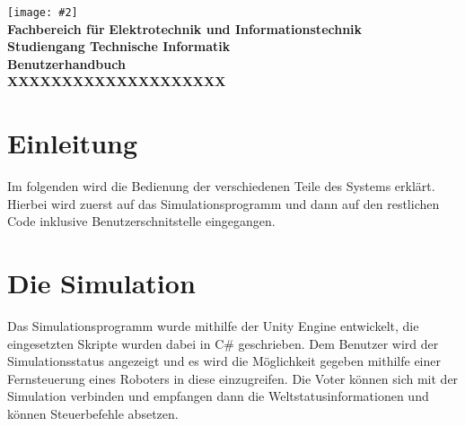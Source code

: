 \documentclass[
    12pt,
    bibliography=totoc,
    ngerman,
    enabledeprecatedfontcommands
]{scrartcl}
\newcommand{\includevisio}[2][]{\texttt{[image: \#2]}}
\begin{document}

\thispagestyle{empty}
\begin{center}
	\includevisio{fhlogo}\\
	\large
	\textbf{Fachbereich f{\"{u}r}}
	\textbf{Elektrotechnik und Informationstechnik}\\
	\large
	\textbf{Studiengang Technische Informatik}\\
	\vspace*{3cm}
	\LARGE
	\textbf{Benutzerhandbuch}\\
	\Huge
	\vspace*{1cm}
	\textsf{\textbf{XXXXXXXXXXXXXXXXXXXX}}\\
	\vspace*{3cm}
	
	\vfill
	\normalsize
\end{center}
\pagebreak

\section{Einleitung}
Im folgenden wird die Bedienung der verschiedenen Teile des Systems erkl{\"{a}}rt. Hierbei wird zuerst auf das Simulationsprogramm und dann auf
den restlichen Code inklusive Benutzerschnitstelle eingegangen.

\section{Die Simulation}
Das Simulationsprogramm wurde mithilfe der Unity Engine entwickelt, die eingesetzten Skripte wurden
dabei in C\# geschrieben. Dem Benutzer wird der Simulationsstatus angezeigt und es wird die M{\"{o}}glichkeit
gegeben mithilfe einer Fernsteuerung eines Roboters in diese einzugreifen. Die Voter k{\"{o}}nnen sich
mit der Simulation verbinden und empfangen dann die Weltstatusinformationen und k{\"{o}}nnen Steuerbefehle
absetzen.
\end{document}
